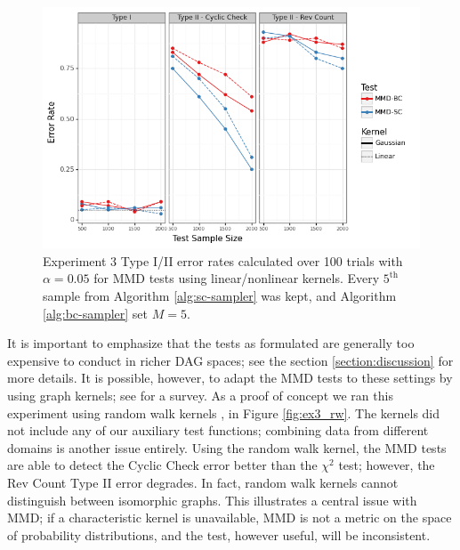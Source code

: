 \documentclass[a4paper,12pt]{article}
\begin{document}
\begin{figure}
    \centering
    \includegraphics[width=\textwidth]{figures/graph_kernel.png}
    \caption{Experiment 3 Type I/II error rates calculated over 100 trials with $\alpha=0.05$ for MMD tests using linear/nonlinear kernels. Every $5^{\text{th}}$ sample from Algorithm \ref{alg:sc-sampler} was kept, and Algorithm \ref{alg:bc-sampler} set $M=5$.}
    \label{fig:ex3_kernel}
\end{figure}

It is important to emphasize that the tests as formulated are generally too expensive to conduct in richer DAG spaces; see the section \ref{section:discussion} for more details. It is possible, however, to adapt the MMD tests to these settings by using graph kernels; see \cite{kriege_survey_2020} for a survey. As a proof of concept we ran this experiment using random walk kernels \cite{gartner_graph_2003}, \cite{vishwanathan_fast_2006} in Figure \ref{fig:ex3_rw}. The kernels did not include any of our auxiliary test functions; combining data from different domains is another issue entirely. Using the random walk kernel, the MMD tests are able to detect the Cyclic Check error better than the $\chi^{2}$ test; however, the Rev Count Type II error degrades. In fact, random walk kernels cannot distinguish between isomorphic graphs. This illustrates a central issue with MMD; if a characteristic kernel is unavailable, MMD is not a metric on the space of probability distributions, and the test, however useful, will be inconsistent.
\end{document}
